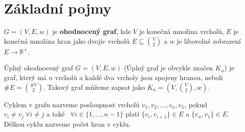 \section{Základní pojmy}
\label{sec:zakladni-pojmy}


\begin{definition}
    $G = (V, E, w)$ je \textbf{ohodnocený graf}, kde $V$ je konečná množina vrcholů, $E$ je konečná množina hran jako dvojic vrcholů $E \subseteq{{V}\choose{2}}$ a $w$ je libovolné zobrazení $E \rightarrow \mathds{R}^+$.
\end{definition}

\begin{definition}
    Úplný ohodnocený graf $G = (V, E, w)$ (Úplný graf je obvykle značen $K_n$) je graf, který má $n$ vrcholů a každé dva vrcholy jsou spojeny hranou, neboli $\#E = {{\#V}\choose{2}}$. Takový graf můžeme zapsat jako $K_n = (V, {{V}\choose{2}}, w)$.
\end{definition}

\begin{definition}[Cyklus]
    Cyklem v grafu nazveme posloupnost vrcholů $v_1, v_2, \dots, v_n, v_1$, pokud  $v_i \neq v_j~\forall i \neq j$ a také~  $\forall i \in \{1,\dots, n-1\}$ platí $\{v_i, v_{i+1}\} \in E$ a $\{v_n, v_1\} \in E$. Délkou cyklu nazveme počet hran v cyklu.
\end{definition}